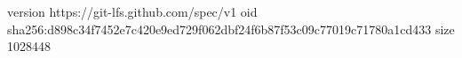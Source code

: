 version https://git-lfs.github.com/spec/v1
oid sha256:d898c34f7452e7c420e9ed729f062dbf24f6b87f53c09c77019c71780a1cd433
size 1028448
